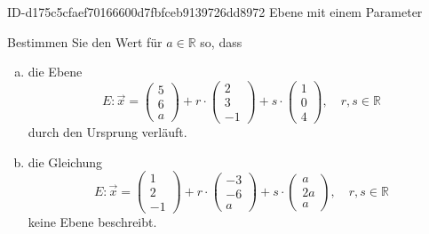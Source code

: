 \begin{exercise}
      {ID-d175c5cfaef70166600d7fbfceb9139726dd8972}
      {Ebene mit einem Parameter}
  \ifproblem\problem\par
    Bestimmen Sie den Wert für $a\in\mathbb{R}$ so, dass
    \begin{enumerate}[a)]
      \item die Ebene
            \begin{equation*}
              E:\vec{x}=
              \begin{pmatrix}5\\6\\a\end{pmatrix}
              +r\cdot
              \begin{pmatrix}2\\3\\-1\end{pmatrix}
              +s\cdot
              \begin{pmatrix}1\\0\\4\end{pmatrix}
              ,\quad r,s\in\mathbb{R}
            \end{equation*}
            durch den Ursprung verläuft.
      \item die Gleichung
            \begin{equation*}
              E:\vec{x}=
              \begin{pmatrix}1\\2\\-1\end{pmatrix}
              +r\cdot
              \begin{pmatrix}-3\\-6\\a\end{pmatrix}
              +s\cdot
              \begin{pmatrix}a\\2a\\a\end{pmatrix}
              ,\quad r,s\in\mathbb{R}
            \end{equation*}
            keine Ebene beschreibt.
    \end{enumerate}
  \fi
  \ifoutcome\outcome\par
    \begin{enumerate}[a)]

\end{enumerate}
\end{exercise}
